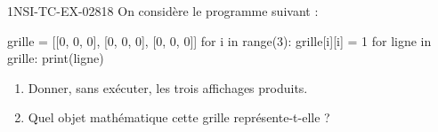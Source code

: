 \begin{exercice}{1NSI-TC-EX-028}{1}{8}
On considère le programme suivant :
\begin{python}
grille = [[0, 0, 0],
           [0, 0, 0],
           [0, 0, 0]]
for i in range(3):
    grille[i][i] = 1
for ligne in grille:
    print(ligne)
\end{python}
\begin{enumerate}
  \item Donner, sans exécuter, les trois affichages produits.
  \item Quel objet mathématique cette grille représente-t-elle ?
\end{enumerate}
\end{exercice}
